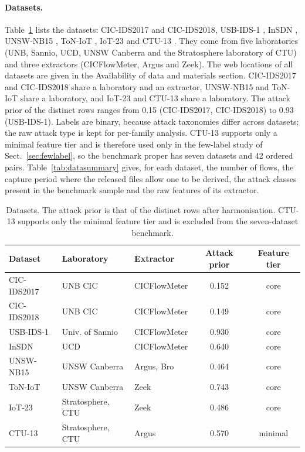 \documentclass[pdflatex,sn-mathphys-num]{sn-jnl}%
\begin{document}
\paragraph{Datasets.}
Table~\ref{tab:datasets} lists the datasets: CIC-IDS2017 \citep{sharafaldin2018cicids} and CIC-IDS2018, USB-IDS-1 \citep{catillo2021usbids1}, InSDN \citep{elsayed2020insdn}, UNSW-NB15 \citep{moustafa2015unsw}, ToN-IoT \citep{alsaedi2020toniot}, IoT-23 \citep{garcia2020iot23} and CTU-13 \citep{garcia2014ctu13}.
They come from five laboratories (UNB, Sannio, UCD, UNSW Canberra and the Stratosphere laboratory of CTU) and three extractors (CICFlowMeter, Argus and Zeek).
The web locations of all datasets are given in the Availability of data and materials section.
CIC-IDS2017 and CIC-IDS2018 share a laboratory and an extractor, UNSW-NB15 and ToN-IoT share a laboratory, and IoT-23 and CTU-13 share a laboratory.
The attack prior of the distinct rows ranges from 0.15 (CIC-IDS2017, CIC-IDS2018) to 0.93 (USB-IDS-1).
Labels are binary, because attack taxonomies differ across datasets; the raw attack type is kept for per-family analysis.
CTU-13 supports only a minimal feature tier and is therefore used only in the few-label study of Sect.~\ref{sec:fewlabel}, so the benchmark proper has seven datasets and 42 ordered pairs.
Table~\ref{tab:datasummary} gives, for each dataset, the number of flows, the capture period where the released files allow one to be derived, the attack classes present in the benchmark sample and the raw features of its extractor.

\begin{table}[htbp]
\centering\small
\caption{Datasets. The attack prior is that of the distinct rows after harmonisation. CTU-13 supports only the minimal feature tier and is excluded from the seven-dataset benchmark.}\label{tab:datasets}
{\scriptsize\setlength{\tabcolsep}{2.5pt}\begin{tabular}{lllcc}
\toprule
Dataset & Laboratory & Extractor & Attack prior & Feature tier \\
\midrule
CIC-IDS2017 & UNB CIC & CICFlowMeter & 0.152 & core \\
CIC-IDS2018 & UNB CIC & CICFlowMeter & 0.149 & core \\
USB-IDS-1 & Univ. of Sannio & CICFlowMeter & 0.930 & core \\
InSDN & UCD & CICFlowMeter & 0.640 & core \\
UNSW-NB15 & UNSW Canberra & Argus, Bro & 0.464 & core \\
ToN-IoT & UNSW Canberra & Zeek & 0.743 & core \\
IoT-23 & Stratosphere, CTU & Zeek & 0.486 & core \\
CTU-13 & Stratosphere, CTU & Argus & 0.570 & minimal \\
\bottomrule
\end{tabular}}
\end{table}
\end{document}
